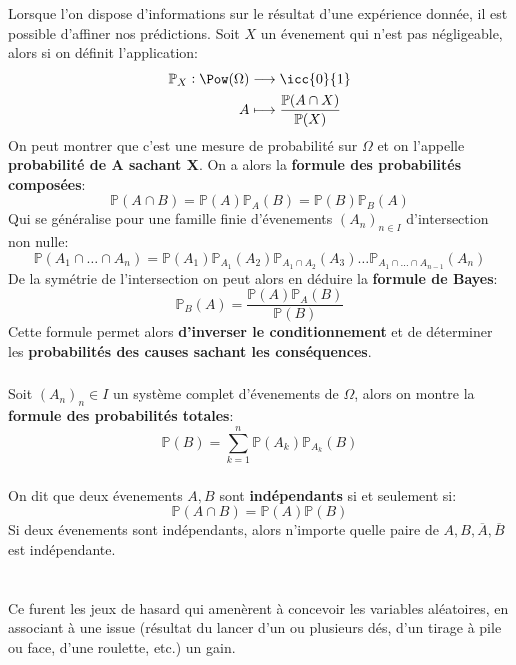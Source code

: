 \subsection*{}
Lorsque l'on dispose d'informations sur le résultat d'une expérience donnée, il est possible d'affiner nos
prédictions. \+
Soit \(X\) un évenement qui n'est pas négligeable, alors si on définit l'application:
\[
   \begin{aligned}
      \mathbb{P}_X: \Pow(\Omega) &\longrightarrow \icc{0}{1}\\
      A &\longmapsto \frac{\mathbb{P}(A \cap X)}{\mathbb{P}(X)}
   \end{aligned}
\]
On peut montrer que c'est une mesure de probabilité sur \(\Omega\) et on l'appelle \textbf{probabilité de A sachant X}.\+
On a alors la \textbf{formule des probabilités composées}:
\[
   \mathbb{P}(A \cap B) = \mathbb{P}(A)\mathbb{P}_A(B) = \mathbb{P}(B)\mathbb{P}_B(A)
\]
Qui se généralise pour une famille finie d'évenements \((A_n)_{n \in I}\) d'intersection non nulle:
\[
   \mathbb{P}(A_1 \cap \ldots \cap A_n) = \mathbb{P}(A_1)\mathbb{P}_{A_1}(A_2)\mathbb{P}_{A_1\cap A_2}(A_3)\ldots\mathbb{P}_{A_1\cap \ldots \cap A_{n-1}}(A_n)
\]
De la symétrie de l'intersection on peut alors en déduire la \textbf{formule de Bayes}:
\[   
   \mathbb{P}_B(A) = \frac{\mathbb{P}(A) \mathbb{P}_A(B)}{\mathbb{P}(B)}
\]
Cette formule permet alors \textbf{d'inverser le conditionnement} et de déterminer les \textbf{probabilités des causes sachant les conséquences}.

\subsection*{}
Soit \((A_n)_n \in I\) un système complet d'évenements de \(\Omega\), alors on montre la \textbf{formule des probabilités totales}:
\[
   \mathbb{P}(B) = \sum_{k=1}^{n} \mathbb{P}(A_k) \mathbb{P}_{A_k}(B)
\]

\subsection*{}
On dit que deux évenements \(A, B\) sont \textbf{indépendants} si et seulement si:
\[
   \mathbb{P}(A \cap B) = \mathbb{P}(A)\mathbb{P}(B)
\]
Si deux évenements sont indépendants, alors n'importe quelle paire de \(A, B, \overline{A}, \overline{B}\) est indépendante.

\chapter*{}
Ce furent les jeux de hasard qui amenèrent à concevoir les variables aléatoires, en associant à une issue (résultat du lancer d'un ou plusieurs dés, d'un tirage à pile ou face, d'une roulette, etc.) un gain.\<

